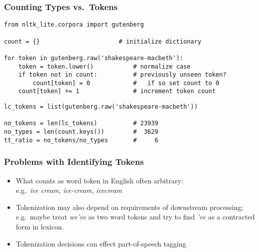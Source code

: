 \begin{frame}[fragile]
  \frametitle{Counting Types vs.\ Tokens}
{\small
\begin{verbatim}
from nltk_lite.corpora import gutenberg

count = {}                      # initialize dictionary

for token in gutenberg.raw('shakespeare-macbeth'):    
    token = token.lower()           # normalize case
    if token not in count:          # previously unseen token?
        count[token] = 0            #   if so set count to 0
    count[token] += 1               # increment token count
\end{verbatim}

\begin{verbatim}
lc_tokens = list(gutenberg.raw('shakespeare-macbeth'))

no_tokens = len(lc_tokens)          # 23939
no_types = len(count.keys())        #  3629
tt_ratio = no_tokens/no_types       #     6
\end{verbatim}
}
\end{frame}

\begin{frame}[fragile]
  \frametitle{Problems with Identifying Tokens}

  \begin{itemize}
  \item<1-> What counts as word token in English often arbitrary: \\
    e.g.\ \textit{ice cream},     \textit{ice-cream},     \textit{icecream}
  \item<2-> Tokenization may also depend on requirements of downstream
    processing; e.g.\ maybe treat \textit{we've} as two word
    tokens and try to find \textit{'ve} as a contracted form in lexicon.
  \item<3-> Tokenization decisions can effect part-of-speech tagging

  \end{itemize}

\end{frame}

